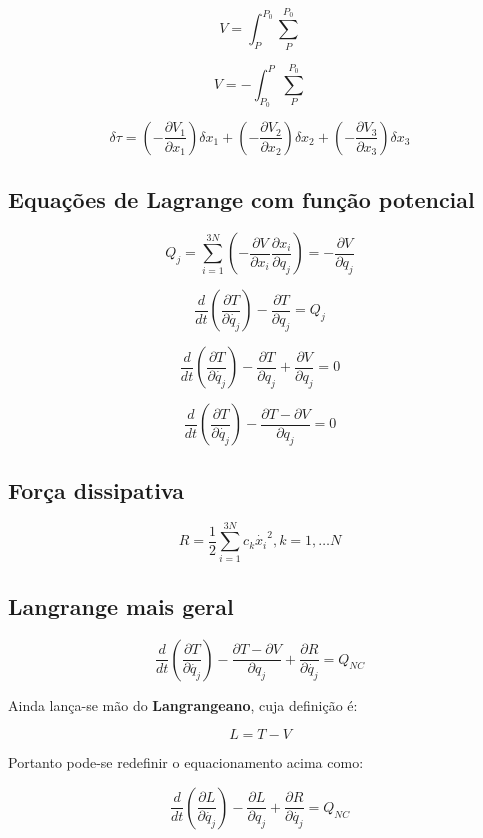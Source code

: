 $$ V = \int_{P}^{P_0} \sum_{P}^{P_0} $$

$$ V = - \int_{P_0}^{P} \sum_{P}^{P_0} $$

$$ \boxed{\delta \tau = (-\frac{\partial V_1}{\partial x_1})\delta x_1 + (-\frac{\partial V_2}{\partial x_2})\delta x_2 + (-\frac{\partial V_3}{\partial x_3})\delta x_3}$$

\subsection{Equações de Lagrange com função potencial}

$$Q_j = \sum_{i=1}^{3N} (-\frac{\partial V}{\partial x_i}\frac{\partial x_i}{\partial q_j}) = -\frac{\partial V}{\partial q_j} $$

$$ \frac{d}{dt}(\frac{\partial T}{\partial \dot{q_j}}) - \frac{\partial T}{\partial q_j} = Q_j $$

$$ \frac{d}{dt}(\frac{\partial T}{\partial \dot{q_j}}) - \frac{\partial T}{\partial q_j} + \frac{\partial V}{\partial q_j} = 0 $$

$$ \boxed{\frac{d}{dt}(\frac{\partial T}{\partial \dot{q_j}}) - \frac{\partial T - \partial V}{\partial q_j} = 0} $$

\subsection{Força dissipativa}

$$ R = \frac{1}{2} \sum_{i=1}^{3N} c_k\dot{x_i}^2, k=1, \dots N $$

\subsection{Langrange mais geral}

$$ \boxed{\frac{d}{dt}(\frac{\partial T}{\partial \dot{q_j}}) - \frac{\partial T - \partial V}{\partial q_j} + \frac{\partial R}{\partial \dot{q_j}} = Q_{NC}} $$

Ainda lança-se mão do \textbf{Langrangeano}, cuja definição é:

$$ L = T - V $$

Portanto pode-se redefinir o equacionamento acima como:

$$ \boxed{\frac{d}{dt}(\frac{\partial L}{\partial \dot{q_j}}) - \frac{\partial L}{\partial q_j} + \frac{\partial R}{\partial \dot{q_j}} = Q_{NC}} $$


